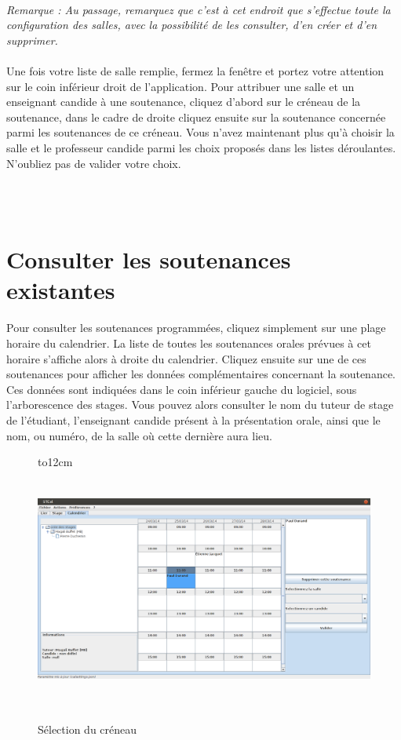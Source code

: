 \documentclass[a4paper,10pt]{report}
\begin{document}
	\paragraph{}  
	  \textit{Remarque : Au passage, remarquez que c'est à cet endroit que s'effectue toute la configuration des salles, avec la possibilité de les consulter, d'en créer et d'en supprimer.}
	  
	\paragraph{}
	  Une fois votre liste de salle remplie, fermez la fenêtre et portez votre attention sur le coin inférieur droit de l'application.
	  Pour attribuer une salle et un enseignant candide à une soutenance, cliquez d'abord sur le créneau de la soutenance, dans le cadre de droite cliquez ensuite sur la soutenance concernée parmi les soutenances de ce créneau.
	  Vous n'avez maintenant plus qu'à choisir la salle et le professeur candide parmi les choix proposés dans les listes déroulantes.
	  N'oubliez pas de valider votre choix.
	  
	
	~\\~\\
    \section{Consulter les soutenances existantes}
      \paragraph{}
	Pour consulter les soutenances programmées, cliquez simplement sur une plage horaire du calendrier.
	La liste de toutes les soutenances orales prévues à cet horaire s'affiche alors à droite du calendrier.
	Cliquez ensuite sur une de ces soutenances pour afficher les données complémentaires concernant la soutenance.
	Ces données sont indiquées dans le coin inférieur gauche du logiciel, sous l'arborescence des stages.
	Vous pouvez alors consulter le nom du tuteur de stage de l'étudiant, l'enseignant candide présent à la présentation orale, ainsi que le nom, ou numéro, de la salle où cette dernière aura lieu.
      
	 \begin{figure}[H]
	    \hbox to12cm{\hss\includegraphics[height=8cm,width=18cm]{../general/creneau.png}\hss}
	    \caption{Sélection du créneau}
	 \end{figure}
      ~\\
\end{document}
